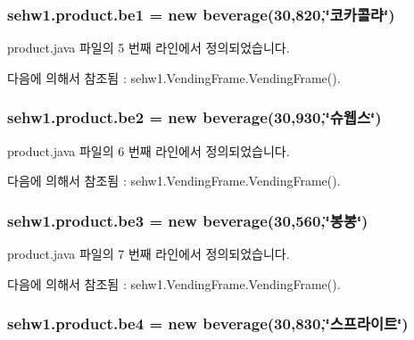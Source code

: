 \subsubsection[{\texorpdfstring{be1}{be1}}]{ sehw1.\+product.\+be1 = new {\bf beverage}(30,820,\char`\"{}코카콜라\char`\"{})}\hypertarget{classsehw1_1_1product_a78de5ce35a2661747de59366b041bf28}{}\label{classsehw1_1_1product_a78de5ce35a2661747de59366b041bf28}


product.\+java 파일의 5 번째 라인에서 정의되었습니다.



다음에 의해서 참조됨 \+:  sehw1.\+Vending\+Frame.\+Vending\+Frame().

\subsubsection[{\texorpdfstring{be2}{be2}}]{ sehw1.\+product.\+be2 = new {\bf beverage}(30,930,\char`\"{}슈웹스\char`\"{})}\hypertarget{classsehw1_1_1product_a970d42cefd2a8aba360fbc62e1dfcd6f}{}\label{classsehw1_1_1product_a970d42cefd2a8aba360fbc62e1dfcd6f}


product.\+java 파일의 6 번째 라인에서 정의되었습니다.



다음에 의해서 참조됨 \+:  sehw1.\+Vending\+Frame.\+Vending\+Frame().

\subsubsection[{\texorpdfstring{be3}{be3}}]{ sehw1.\+product.\+be3 = new {\bf beverage}(30,560,\char`\"{}봉봉\char`\"{})}\hypertarget{classsehw1_1_1product_a15f8a47cd14f9b7fc8faf4fa5836d125}{}\label{classsehw1_1_1product_a15f8a47cd14f9b7fc8faf4fa5836d125}


product.\+java 파일의 7 번째 라인에서 정의되었습니다.



다음에 의해서 참조됨 \+:  sehw1.\+Vending\+Frame.\+Vending\+Frame().

\subsubsection[{\texorpdfstring{be4}{be4}}]{ sehw1.\+product.\+be4 = new {\bf beverage}(30,830,\char`\"{}스프라이트\char`\"{})}\hypertarget{classsehw1_1_1product_acfca06ee7a734ee15073262cb8fa1c24}{}\label{classsehw1_1_1product_acfca06ee7a734ee15073262cb8fa1c24}


